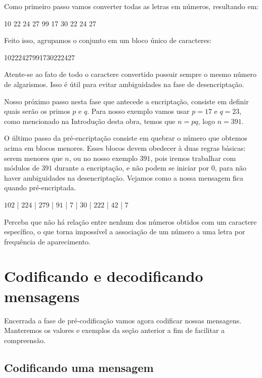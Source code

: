 Como primeiro passo vamos converter todas as letras em n\'umeros, resultando em:
 
\begin{center}
10 22 24 27 99 17 30 22 24 27
\end{center}

Feito isso, agrupamos o conjunto em um bloco \'unico de caracteres:

\begin{center}
10222427991730222427
\end{center}

Atente-se ao fato de todo o caractere convertido possuir sempre o mesmo n\'umero de algarismos. Isso \'e \'util para evitar ambiguidades na fase de desencripta\c{c}\~ao.

Nosso pr\'oximo passo nesta fase que antecede a encripta\c{c}\~ao, consiste em definir quais ser\~ao os primos $p$ e $q$. Para nosso exemplo vamos usar $p=17$ e $q=23$, como mencionado na Introdu\c{c}\~ao desta obra, temos que $n = pq$, logo $n=391$.

O \'ultimo passo da pr\'e-encripta\c{c}\~ao consiste em quebrar o n\'umero que obtemos acima em blocos menores. Esses blocos devem obedecer \`a duas regras b\'asicas: serem menores que $n$, ou no nosso exemplo $391$, pois iremos trabalhar com m\'odulos de $391$ durante a encripta\c{c}\~ao, e n\~ao podem se iniciar por $0$, para n\~ao haver ambiguidades na desencripta\c{c}\~ao. Vejamos como a nossa mensagem fica quando pr\'e-encriptada.

\begin{center}
$102$ | $224$ | $279$ | $91$ | $7$ | $30$ | $222$ | $42$ | $7$
\end{center}

Perceba que n\~ao h\'a rela\c{c}\~ao entre nenhum dos n\'umeros obtidos com um caractere espec\'ifico, o que torna imposs\'ivel a associa\c{c}\~ao de um n\'umero a uma letra por frequ\^encia de aparecimento. 

\section{Codificando e decodificando mensagens}

Encerrada a fase de pr\'e-codifica\c{c}\~ao vamos agora codificar nossas mensagens. Manteremos os valores e exemplos da se\c{c}\~ao anterior a fim de facilitar a compreens\~ao.

\subsection{Codificando uma mensagem}


